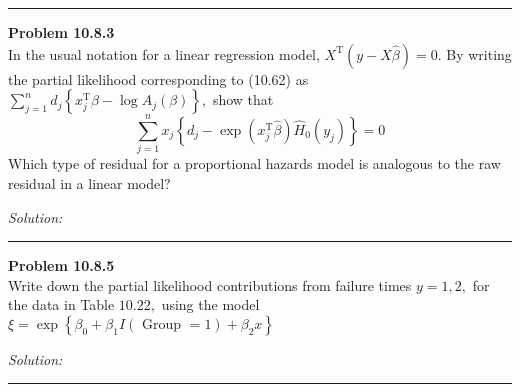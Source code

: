 \documentclass[a4paper, 11pt]{article}
\newenvironment{problem}[2][Problem]
    { \begin{mdframed}[backgroundcolor=gray!20] \textbf{#1 #2} \\}
    {  \end{mdframed}}
\newenvironment{solution}
    {\textit{Solution:}}
    {}
\begin{document}
\noindent\rule{7in}{2.8pt}
\begin{problem}{10.8.3}
  In the usual notation for a linear regression model, $X^{\mathrm{T}}(y-X \widehat{\beta})=0 .$ By writing the partial likelihood corresponding to (10.62) as $\sum_{j=1}^{n} d_{j}\left\{x_{j}^{\mathrm{T}} \beta-\log A_{j}(\beta)\right\},$ show that
$$
\sum_{j=1}^{n} x_{j}\left\{d_{j}-\exp \left(x_{j}^{\mathrm{T}} \widehat{\beta}\right) \widehat{H}_{0}\left(y_{j}\right)\right\}=0
$$
Which type of residual for a proportional hazards model is analogous to the raw residual in a linear model?

\end{problem}
\begin{solution}

\end{solution}

\noindent\rule{7in}{2.8pt}
\begin{problem}{10.8.5}
  Write down the partial likelihood contributions from failure times $y=1,2,$ for the data in Table $10.22,$ using the model $\xi=\exp \left\{\beta_{0}+\beta_{1} I(\text { Group }=1)+\beta_{2} x\right\}$
\end{problem}
\begin{solution}

\end{solution}

\noindent\rule{7in}{2.8pt}
\end{document}
